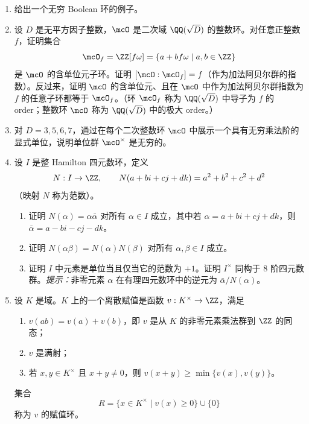\begin{enumerate}[label=\arabic*.]
\[	\]
	即加法为对称差，乘法为交。
	\begin{enumerate}[label=(\alph*)]
		\item 证明 $\mcP(X)$ 在这些运算下构成环（$\mcP(X)$ 及其子环常称为集合环）。
		\item 证明这个环是交换的、有单位元，并且是 Boolean 环。
	\end{enumerate}
	\item 给出一个无穷 Boolean 环的例子。
	\item 设 $D$ 是无平方因子整数，$\mcO$ 是二次域 $\QQ(\sqrt D)$ 的整数环。对任意正整数 $f$，证明集合
	\[
	\mcO_f=\ZZ[f\omega]=\{a+bf\omega\mid a,b\in\ZZ\}
	\]
	是 $\mcO$ 的含单位元子环。证明 $[\mcO:\mcO_f]=f$（作为加法阿贝尔群的指数）。反过来，证明 $\mcO$ 的含单位元、且在 $\mcO$ 中作为加法阿贝尔群指数为 $f$ 的任意子环都等于 $\mcO_f$。（环 $\mcO_f$ 称为 $\QQ(\sqrt D)$ 中导子为 $f$ 的 order；整数环 $\mcO$ 称为 $\QQ(\sqrt D)$ 中的极大 order。）
	\item 对 $D=3,5,6,7$，通过在每个二次整数环 $\mcO$ 中展示一个具有无穷乘法阶的显式单位，说明单位群 $\mcO^\times$ 是无穷的。
	\item 设 $I$ 是整 Hamilton 四元数环，定义
	\[
	N:I\to\ZZ,
	\qquad N(a+bi+cj+dk)=a^2+b^2+c^2+d^2
	\]
	（映射 $N$ 称为范数）。
	\begin{enumerate}[label=(\alph*)]
		\item 证明 $N(\alpha)=\alpha\bar\alpha$ 对所有 $\alpha\in I$ 成立，其中若 $\alpha=a+bi+cj+dk$，则 $\bar\alpha=a-bi-cj-dk$。
		\item 证明 $N(\alpha\beta)=N(\alpha)N(\beta)$ 对所有 $\alpha,\beta\in I$ 成立。
		\item 证明 $I$ 中元素是单位当且仅当它的范数为 $+1$。证明 $I^\times$ 同构于 $8$ 阶四元数群。\emph{提示：}非零元素 $\alpha$ 在有理四元数环中的逆元为 $\bar\alpha/N(\alpha)$。
	\end{enumerate}
	\item 设 $K$ 是域。$K$ 上的一个离散赋值是函数 $v:K^\times\to\ZZ$，满足
	\begin{enumerate}[label=(\roman*)]
		\item $v(ab)=v(a)+v(b)$，即 $v$ 是从 $K$ 的非零元素乘法群到 $\ZZ$ 的同态；
		\item $v$ 是满射；
		\item 若 $x,y\in K^\times$ 且 $x+y\neq0$，则 $v(x+y)\geq \min\{v(x),v(y)\}$。
	\end{enumerate}
	集合
	\[
	R=\{x\in K^\times\mid v(x)\geq0\}\cup\{0\}
	\]
	称为 $v$ 的赋值环。
	\begin{enumerate}[label=(\alph*)]

\end{enumerate}
\end{enumerate}
